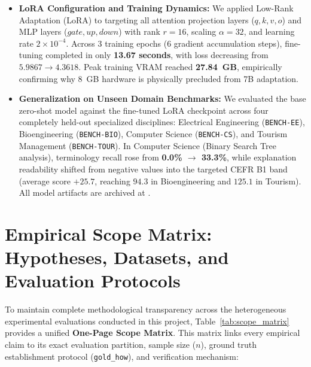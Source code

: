 \documentclass[a4paper,12pt]{report}
\begin{document}
\begin{itemize}
    \item \textbf{LoRA Configuration and Training Dynamics:} We applied Low-Rank Adaptation (LoRA) to  targeting all attention projection layers ($q, k, v, o$) and MLP layers ($gate, up, down$) with rank $r=16$, scaling $\alpha=32$, and learning rate $2 \times 10^{-4}$. Across 3 training epochs (6 gradient accumulation steps), fine-tuning completed in only \textbf{13.67 seconds}, with loss decreasing from $5.9867 \to 4.3618$. Peak training VRAM reached \textbf{27.84~GB}, empirically confirming why 8~GB hardware is physically precluded from 7B adaptation.
    \item \textbf{Generalization on Unseen Domain Benchmarks:} We evaluated the base zero-shot model against the fine-tuned LoRA checkpoint across four completely held-out specialized disciplines: Electrical Engineering (\texttt{BENCH-EE}), Bioengineering (\texttt{BENCH-BIO}), Computer Science (\texttt{BENCH-CS}), and Tourism Management (\texttt{BENCH-TOUR}). In Computer Science (Binary Search Tree analysis), terminology recall rose from \textbf{0.0\% $\to$ 33.3\%}, while explanation readability shifted from negative values into the targeted CEFR B1 band (average score $+25.7$, reaching $94.3$ in Bioengineering and $125.1$ in Tourism). All model artifacts are archived at .
\end{itemize}

\section{Empirical Scope Matrix: Hypotheses, Datasets, and Evaluation Protocols}
\label{sec:scope_matrix}
To maintain complete methodological transparency across the heterogeneous experimental evaluations conducted in this project, Table~\ref{tab:scope_matrix} provides a unified \textbf{One-Page Scope Matrix}. This matrix links every empirical claim to its exact evaluation partition, sample size ($n$), ground truth establishment protocol (\texttt{gold\_how}), and verification mechanism:
\end{document}
